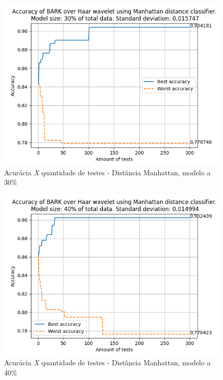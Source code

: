 		\newpage
		\begin{figure}
			\centering
			\includegraphics{images/results/confusionMatrices/classifier_Manhattan_30.png}
			\caption{Acurácia \textit{X} quantidade de testes - Distância Manhattan, modelo a 30\%}
			\label{fig:classifiermanhattan30}
		\end{figure}
		
		
		\newpage
		\begin{figure}
			\centering
			\includegraphics{images/results/confusionMatrices/classifier_Manhattan_40.png}
			\caption{Acurácia \textit{X} quantidade de testes - Distância Manhattan, modelo a 40\%}
			\label{fig:classifiermanhattan40}
		\end{figure}
		
		
